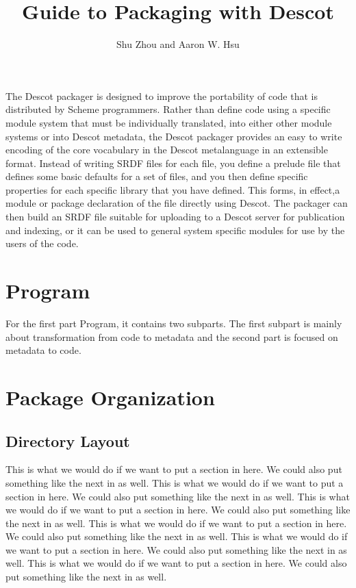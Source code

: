 

\title{Guide to Packaging with Descot}
\author{Shu Zhou and Aaron W. Hsu}

\maketitlepage

\abstract
The Descot packager is designed to improve the portability of code that is distributed
by Scheme programmers. Rather than define code using a specific module system that must be individually translated, into either other module systems or into Descot metadata, the Descot packager provides an easy to write encoding of the core vocabulary in the Descot metalanguage in an extensible format. Instead of writing SRDF files for each file, you define a prelude file that defines some basic defaults for a set of files, and you then define specific properties for each specific library that you have defined. This forms, in effect,a module or package declaration of the file directly using Descot. The packager can then build an SRDF file suitable for uploading to a Descot server for publication and indexing, or it can be used to general system specific modules for use by the users of the code. 
\endabstract

\chapter{Program}{}%
For the first part Program, it contains two subparts. The first subpart is mainly about transformation from code to metadata and the second part is focused on metadata to code. 

\chapter{Package Organization}{}%

\section{Directory Layout}{}%
This is what we would do if we want to put a section in here. We could
also put something like the next in as well. This is what we would do if we want to put a section in here. We could
also put something like the next in as well. This is what we would do if we want to put a section in here. We could
also put something like the next in as well. This is what we would do if we want to put a section in here. We could
also put something like the next in as well. This is what we would do if we want to put a section in here. We could
also put something like the next in as well. This is what we would do if we want to put a section in here. We could
also put something like the next in as well. 

